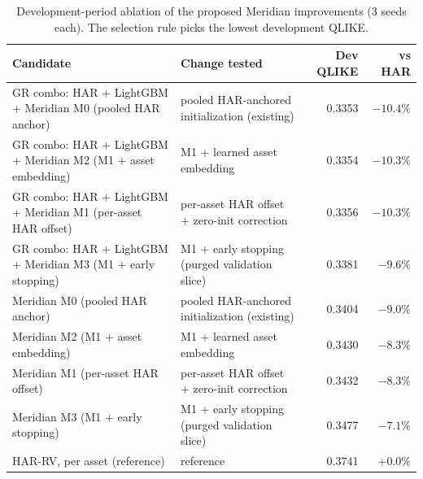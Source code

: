 \begin{table}[!htbp]
\centering
\scriptsize
\caption{Development-period ablation of the proposed Meridian improvements (3 seeds each). The selection rule picks the lowest development QLIKE.}
\label{tab:ablation}
\begin{tabularx}{\linewidth}{XXrr}
\toprule
\textbf{Candidate} & \textbf{Change tested} & \textbf{Dev QLIKE} & \textbf{vs HAR} \\
\midrule
\rowcolor{good}GR combo: HAR + LightGBM + Meridian M0 (pooled HAR anchor) & pooled HAR-anchored initialization (existing) & 0.3353 & $-10.4\%$ \\
GR combo: HAR + LightGBM + Meridian M2 (M1 + asset embedding) & M1 + learned asset embedding & 0.3354 & $-10.3\%$ \\
GR combo: HAR + LightGBM + Meridian M1 (per-asset HAR offset) & per-asset HAR offset + zero-init correction & 0.3356 & $-10.3\%$ \\
GR combo: HAR + LightGBM + Meridian M3 (M1 + early stopping) & M1 + early stopping (purged validation slice) & 0.3381 & $-9.6\%$ \\
Meridian M0 (pooled HAR anchor) & pooled HAR-anchored initialization (existing) & 0.3404 & $-9.0\%$ \\
Meridian M2 (M1 + asset embedding) & M1 + learned asset embedding & 0.3430 & $-8.3\%$ \\
Meridian M1 (per-asset HAR offset) & per-asset HAR offset + zero-init correction & 0.3432 & $-8.3\%$ \\
Meridian M3 (M1 + early stopping) & M1 + early stopping (purged validation slice) & 0.3477 & $-7.1\%$ \\
HAR-RV, per asset (reference) & reference & 0.3741 & $+0.0\%$ \\
\bottomrule
\end{tabularx}
\end{table}

